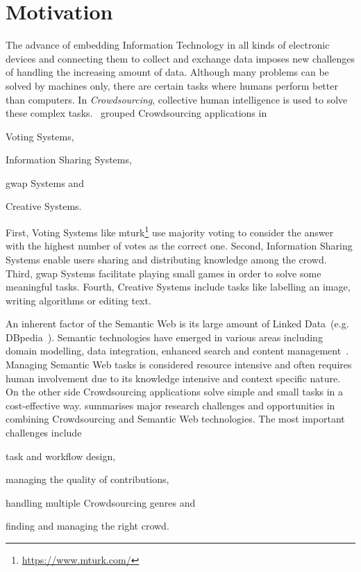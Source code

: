 
\section{Motivation}
The advance of embedding Information Technology in all kinds of electronic devices and connecting them to collect and exchange data imposes new challenges of handling the increasing amount of data. Although many problems can be solved by machines only, there are certain tasks where humans perform better than computers. In \emph{Crowdsourcing}, collective human intelligence is used to solve these complex tasks. \cite{yuen2011}~grouped Crowdsourcing applications in 
\begin{inparaenum}[1)]
		\item Voting Systems,
		\item Information Sharing Systems,
		\item \gls{gwap} Systems and
		\item Creative Systems.
\end{inparaenum} 
First, Voting Systems like \gls{mturk}\footnote{\url{https://www.mturk.com/}} use majority voting to consider the answer with the highest number of votes as the correct one. Second, Information Sharing Systems enable users sharing and distributing knowledge among the crowd. Third, \gls{gwap} Systems facilitate playing small games in order to solve some meaningful tasks. Fourth, Creative Systems include tasks like labelling an image, writing algorithms or editing text. 

An inherent factor of the Semantic Web is its large amount of Linked Data~(e.g. DBpedia~\cite{lehmann2015}). Semantic technologies have emerged in various areas including domain modelling, data integration, enhanced search and content management~\cite{semantic-web-usecases}. Managing Semantic Web tasks is considered resource intensive and often requires human involvement due to its knowledge intensive and context specific nature. On the other side Crowdsourcing applications solve simple and small tasks in a cost-effective way. \cite{sarasua2015crowdsourcing} summarises major research challenges and opportunities in combining Crowdsourcing and Semantic Web technologies. The most important challenges include 
\begin{inparaenum}[1)]
		\item task and workflow design,
		\item managing the quality of contributions,
		\item handling multiple Crowdsourcing genres and 
		\item finding and managing the right crowd.
\end{inparaenum}

